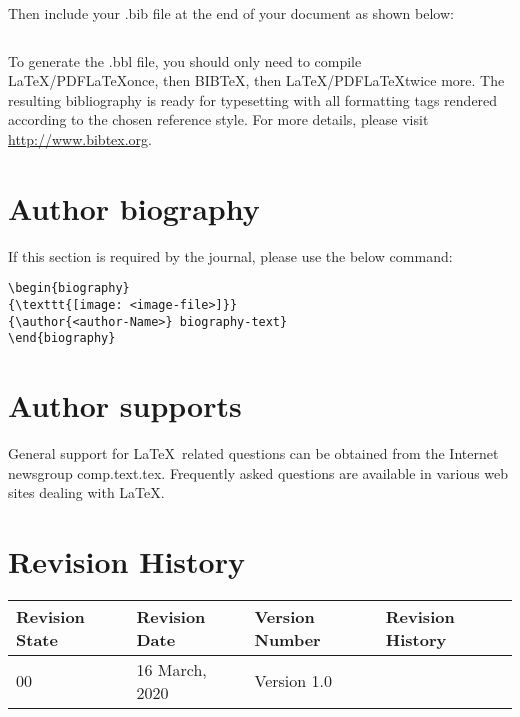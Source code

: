 \documentclass{article}
\begin{document}
Then include your .bib file at the end of your document as shown below:
\begin{verbatim}

\end{verbatim}
To generate the .bbl file, you should only need to compile \LaTeX/PDF\LaTeX once, then BIB\TeX, then \LaTeX/PDF\LaTeX twice more. The resulting bibliography is ready for typesetting with all formatting tags rendered according to the chosen reference style. For more details, please visit \url{http://www.bibtex.org}.
\section{Author biography}
If this section is required by the journal, please use the below command:
\begin{verbatim}
\begin{biography}
{\texttt{[image: <image-file>]}}
{\author{<author-Name>} biography-text}
\end{biography}
\end{verbatim}

\section{Author supports}
General support for \LaTeX\ related questions can be obtained from the Internet newsgroup comp.text.tex. Frequently asked questions are available in various web sites dealing with \LaTeX.


\section{Revision History}

\begin{tabular}{|l|l|l|l|}
\hline
Revision State & Revision Date &  Version Number & Revision History\\
\hline
 00 &    16 March, 2020 & Version 1.0   &   \\
 \hline
\end{tabular}
\end{document}
